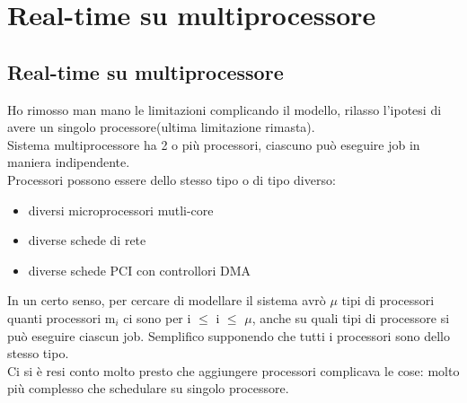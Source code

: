 \documentclass[12pt, oneside]{extbook}
\begin{document}
\chapter{Real-time su multiprocessore}
\section{Real-time su multiprocessore}
Ho rimosso man mano le limitazioni complicando il modello, rilasso l'ipotesi di avere un singolo processore(ultima limitazione rimasta).\\ Sistema multiprocessore ha 2 o più processori, ciascuno può eseguire job in maniera indipendente.\\ Processori possono essere dello stesso tipo o di tipo diverso:
\begin{itemize}
\item diversi microprocessori mutli-core
\item diverse schede di rete
\item diverse schede PCI con controllori DMA
\end{itemize}
In un certo senso, per cercare di modellare il sistema avrò $\mu$ tipi di processori quanti processori m$_{i}$ ci sono per i $\leq$ i $\leq$ $\mu$, anche su quali tipi di processore si può eseguire ciascun job. Semplifico supponendo che tutti i processori sono dello stesso tipo.\\ Ci si è resi conto molto presto che aggiungere processori complicava le cose: molto più complesso che schedulare su singolo processore.
\end{document}
